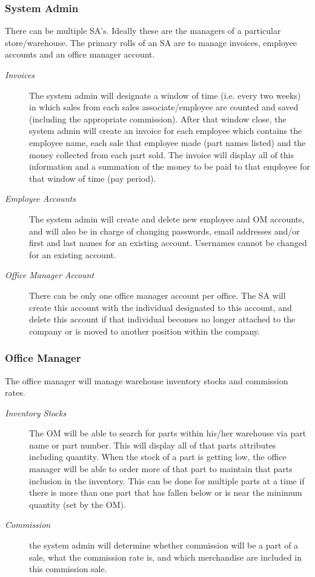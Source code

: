 \documentclass{report}
\begin{document}
\subsubsection{System Admin}
\label{sec:admin}
There can be multiple SA’s. Ideally these are the managers of a particular store/warehouse. The primary rolls of an SA are to manage invoices, employee accounts and an office manager account.\par
\begin{description}
  \item[\textit{Invoices}] The system admin will designate a window of time (i.e. every two weeks) in which sales from each sales associate/employee are counted and saved (including the appropriate commission). After that window close, the system admin will create an invoice for each employee which contains the employee name, each sale that employee made (part names listed) and the money collected from each part sold. The invoice will display all of this information and a summation of the money to be paid to that employee for that window of time (pay period).
  \item[\textit{Employee Accounts}] The system admin will create and delete new employee and OM accounts, and will also be in charge of changing passwords, email addresses and/or first and last names for an existing account. Usernames cannot be changed for an existing account.\par
  \item[\textit{Office Manager Account}] There can be only one office manager account per office. The SA will create this account with the individual designated to this account, and delete this account if that individual becomes no longer attached to the company or is moved to another position within the company.\par
\end{description}
\subsubsection{Office Manager}
\label{sec:om}
The office manager will manage warehouse inventory stocks and commission rates.\par
\begin{description}
  \item[\textit{Inventory Stocks}] The OM will be able to search for parts within his/her warehouse via part name or part number. This will display all of that parts attributes including quantity. When the stock of a part is getting low, the office manager will be able to order more of that part to maintain that parts inclusion in the inventory. This can be done for multiple parts at a time if there is more than one part that has fallen below or is near the minimum quantity (set by the OM).\par
  \item[\textit{Commission}] the system admin will determine whether commission will be a part of a sale, what the commission rate is, and which merchandise are included in this commission sale.\par
\end{description}
\end{document}
